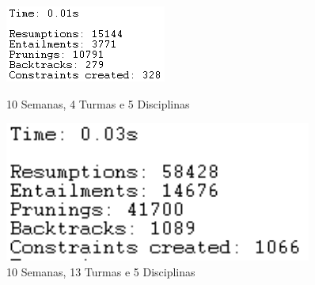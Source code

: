 \documentclass{llncs}
\begin{document}
\begin{figure}
\centering
    \begin{minipage}{0.45\textwidth}
    \centering
    \includegraphics[width=.9\textwidth]{10Semanas_4Turmas_5Disciplinas}
    \caption{10 Semanas, 4 Turmas e 5 Disciplinas}
    \end{minipage}\hfill
    \begin{minipage}{0.45\textwidth}
    \centering
    \includegraphics[width=0.9\textwidth]{10Semanas_13Turmas_5Disciplinas}
    \caption{10 Semanas, 13 Turmas e 5 Disciplinas}
    \end{minipage}\hfill
\end{figure}
\FloatBarrier
\end{document}
